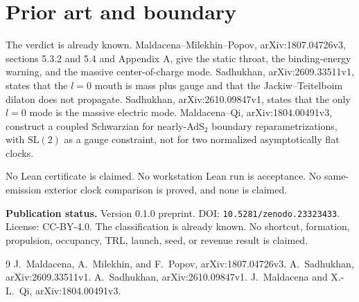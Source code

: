 \documentclass[11pt]{article}
\begin{document}
\section{Prior art and boundary}
The verdict is already known. Maldacena--Milekhin--Popov, arXiv:1807.04726v3, sections 5.3.2 and 5.4 and Appendix A, give the static throat, the binding-energy warning, and the massive center-of-charge mode. Sadhukhan, arXiv:2609.33511v1, states that the \(l=0\) mouth is mass plus gauge and that the Jackiw--Teitelboim dilaton does not propagate. Sadhukhan, arXiv:2610.09847v1, states that the only \(l=0\) mode is the massive electric mode. Maldacena--Qi, arXiv:1804.00491v3, construct a coupled Schwarzian for nearly-AdS\(_2\) boundary reparametrizations, with \(\mathrm{SL}(2)\) as a gauge constraint, not for two normalized asymptotically flat clocks.

No Lean certificate is claimed. No workstation Lean run is acceptance. No same-emission exterior clock comparison is proved, and none is claimed.

\noindent\textbf{Publication status.} Version 0.1.0 preprint. DOI: \texttt{10.5281/zenodo.23323433}. License: CC-BY-4.0. The classification is already known. No shortcut, formation, propulsion, occupancy, TRL, launch, seed, or revenue result is claimed.

\begin{thebibliography}{9}
 J.~Maldacena, A.~Milekhin, and F.~Popov, arXiv:1807.04726v3.
 A.~Sadhukhan, arXiv:2609.33511v1.
 A.~Sadhukhan, arXiv:2610.09847v1.
 J.~Maldacena and X.-L.~Qi, arXiv:1804.00491v3.
\end{thebibliography}
\end{document}
